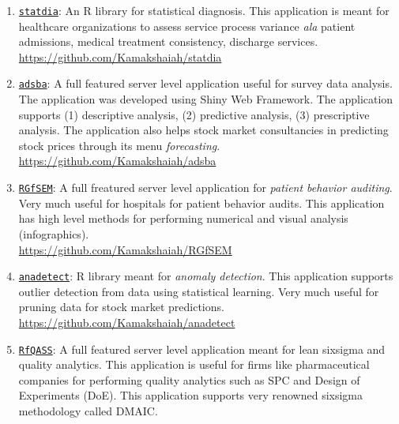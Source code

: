 \documentclass[10pt]{article}
\begin{document}
\begin{multicols}{2}

\begin{enumerate}
\item \texttt{\underline{statdia}}: An R library for statistical diagnosis. This application is meant for healthcare organizations to assess service process variance \emph{ala} patient admissions, medical treatment consistency, discharge services. \\

\url{https://github.com/Kamakshaiah/statdia}

\item \texttt{\underline{adsba}}: A full featured server level application useful for survey data analysis. The application was developed using Shiny Web Framework. The application supports (1) descriptive analysis, (2) predictive analysis, (3) prescriptive analysis. The application also helps stock market consultancies in predicting stock prices through its menu \emph{forecasting}. \\

\url{https://github.com/Kamakshaiah/adsba}

\item \texttt{\underline{RGfSEM}}: A full freatured server level application for \emph{patient behavior auditing}. Very much useful for hospitals for patient behavior audits. This application has high level methods for performing numerical and visual analysis (infographics).\\

\url{https://github.com/Kamakshaiah/RGfSEM}

\item \texttt{\underline{anadetect}}: R library meant for \emph{anomaly detection}. This application supports outlier detection from data using statistical learning. Very much useful for pruning data for stock market predictions. \\

\url{https://github.com/Kamakshaiah/anadetect}

\item \texttt{\underline{RfQASS}}: A full featured server level application meant for lean sixsigma and quality analytics. This application is useful for firms like pharmaceutical companies for performing quality analytics such as SPC and Design of Experiments (DoE). This application supports very renowned sixsigma methodology called DMAIC. \\


\end{enumerate}
\end{multicols}
\end{document}
